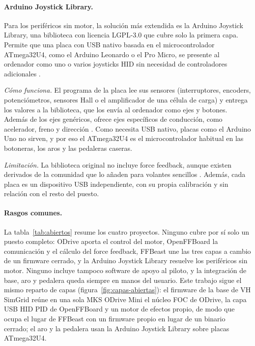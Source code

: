 \paragraph{Arduino Joystick Library.}
Para los periféricos sin motor, la solución más extendida es la Arduino Joystick Library, una biblioteca con licencia LGPL-3.0 que cubre solo la primera capa. Permite que una placa con USB nativo basada en el microcontrolador ATmega32U4, como el Arduino Leonardo o el Pro Micro, se presente al ordenador como uno o varios joysticks HID sin necesidad de controladores adicionales \parencite{arduino_joystick_library}.

\textit{Cómo funciona.} El programa de la placa lee sus sensores (interruptores, encoders, potenciómetros, sensores Hall o el amplificador de una célula de carga) y entrega los valores a la biblioteca, que los envía al ordenador como ejes y botones. Además de los ejes genéricos, ofrece ejes específicos de conducción, como acelerador, freno y dirección \parencite{arduino_joystick_library}. Como necesita USB nativo, placas como el Arduino Uno no sirven, y por eso el ATmega32U4 es el microcontrolador habitual en las botoneras, los aros y las pedaleras caseras.

\textit{Limitación.} La biblioteca original no incluye force feedback, aunque existen derivados de la comunidad que lo añaden para volantes sencillos \parencite{arduino_joystick_library}. Además, cada placa es un dispositivo USB independiente, con su propia calibración y sin relación con el resto del puesto.

\paragraph{Rasgos comunes.}
La tabla~\ref{tab:abiertos} resume los cuatro proyectos. Ninguno cubre por sí solo un puesto completo: ODrive aporta el control del motor, OpenFFBoard la comunicación y el cálculo del force feedback, FFBeast une las tres capas a cambio de un firmware cerrado, y la Arduino Joystick Library resuelve los periféricos sin motor. Ninguno incluye tampoco software de apoyo al piloto, y la integración de base, aro y pedalera queda siempre en manos del usuario. Este trabajo sigue el mismo reparto de capas (figura~\ref{fig:capas-abiertas}): el firmware de la base de VH SimGrid reúne en una sola MKS ODrive Mini el núcleo FOC de ODrive, la capa USB HID PID de OpenFFBoard y un motor de efectos propio, de modo que ocupa el lugar de FFBeast con un firmware propio en lugar de un binario cerrado; el aro y la pedalera usan la Arduino Joystick Library sobre placas ATmega32U4.

